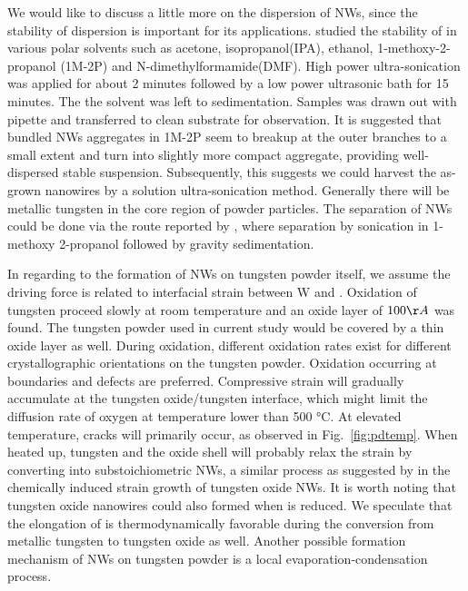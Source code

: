We would like to discuss a little more on the dispersion of  NWs, since the stability of  dispersion is important for its applications. \citeauthor{Kozan2008} studied the stability of  in various polar solvents such as acetone, isopropanol(IPA), ethanol, 1-methoxy-2-propanol (1M-2P) and N-dimethylformamide(DMF).\cite{Kozan2008} High power ultra-sonication was applied for about 2 minutes followed by a low power ultrasonic bath for 15 minutes. The the solvent was left to sedimentation. Samples was drawn out with pipette and transferred to clean substrate for observation. It is suggested that bundled NWs aggregates in 1M-2P seem to breakup at the outer branches to a small extent and turn into slightly more compact aggregate, providing well-dispersed stable suspension. Subsequently, this suggests we could harvest the as-grown nanowires by a solution ultra-sonication method. Generally there will be metallic tungsten in the core region of powder particles. The separation of NWs could be done via the route reported by \citeauthor{Kumar2008}, where separation by sonication in 1-methoxy 2-propanol followed by gravity sedimentation.\cite{Kozan2008}


In regarding to the formation of NWs on tungsten powder itself, we assume the driving force is related to interfacial strain between W and . Oxidation of tungsten proceed slowly at room temperature and an oxide layer of $100 \AA$  was found.\cite{Warren1996} The tungsten powder used in current study would be covered by a thin oxide layer as well. During oxidation, different oxidation rates exist for different crystallographic orientations on the tungsten powder. Oxidation occurring at boundaries and defects are preferred.\cite{You2010} Compressive strain will gradually accumulate at the tungsten oxide/tungsten interface, which might limit the diffusion rate of oxygen at temperature lower than 500 \si{\degreeCelsius}.\cite{tungsten1999} At elevated temperature, cracks will primarily occur, as observed in Fig.~\ref{fig:pdtemp}. When heated up, tungsten and the oxide shell will probably relax the strain by converting into substoichiometric NWs, a similar process as suggested by \citeauthor{Klinke2005} in the chemically induced strain growth of tungsten oxide NWs.\cite{Klinke2005} It is worth noting that tungsten oxide nanowires could also formed when  is reduced.\cite{Sarin1975} We speculate that the elongation of  is thermodynamically favorable during the conversion from metallic tungsten to tungsten oxide as well. Another possible formation  mechanism of NWs on tungsten powder is a local evaporation-condensation process.

